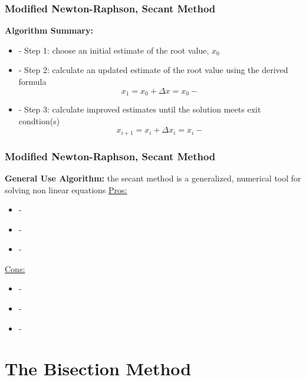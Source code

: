 \documentclass[fleqn]{beamer} %
\newcommand{\sectionIIItitle}{The Bisection Method}
\newcommand{\sectionIIsubsectionVtitle}{Modified Newton-Raphson, Secant Method}
\begin{document}
			\begin{frame}
				\frametitle{\sectionIIsubsectionVtitle}
				\bigskip

				\textbf{Algorithm Summary:}
				\begin{itemize}
						\item - Step 1: choose an initial estimate of the root value, $x_0$  
					\item - Step 2: calculate an updated estimate of the root value using the derived formula \vspace{2mm} \\
						\[ x_{1}=x_0 + \Delta x = x_0 -  \]
					\item - Step 3: calculate improved estimates until the solution meets exit condtion(s)
						\[ x_{i+1}=x_i + \Delta x_i = x_i -  \]
				\end{itemize}
				\btVFill 
			\end{frame}

			\begin{frame}
				\frametitle{\sectionIIsubsectionVtitle}\small
				\bigskip

				\textbf{General Use Algorithm:} the secant method is a generalized, numerical tool for solving non linear equations \vspcc
				\underline{Pros:}
				\begin{itemize}
			    	\item -
			    	\item -
			    	\item -
				\end{itemize} 

				\underline{Cons:}
				\begin{itemize}
					\item -
					\item -
					\item -
				\end{itemize}
				
				\btVFill 
			\end{frame}	
		
	\section{\sectionIIItitle}\label{sectionIII}
\end{document}
